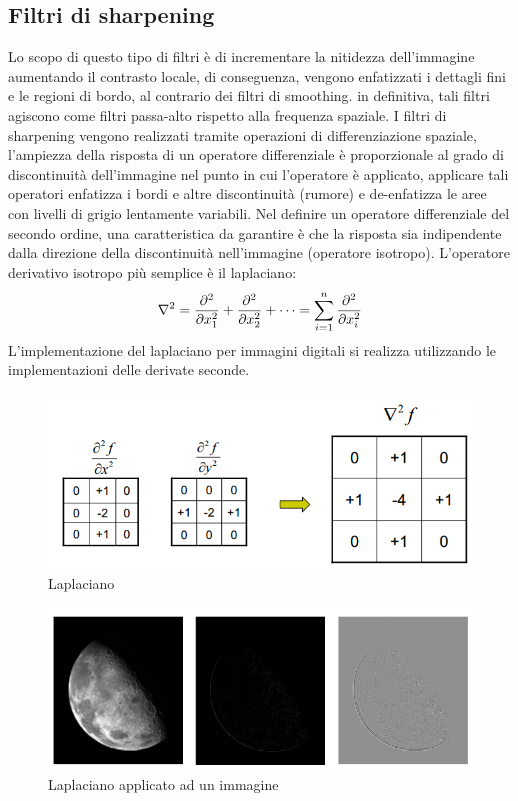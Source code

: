 \subsection{Filtri di sharpening}
Lo scopo di questo tipo di filtri è di incrementare la nitidezza dell’immagine 
aumentando il contrasto locale, di conseguenza, vengono enfatizzati i 
dettagli fini e le regioni di bordo, al contrario 
dei filtri di smoothing. in definitiva, tali filtri agiscono come filtri 
passa-alto rispetto alla frequenza spaziale.
I filtri di sharpening vengono realizzati tramite operazioni di 
differenziazione spaziale, l’ampiezza della risposta di un operatore 
differenziale è proporzionale al grado di discontinuità dell’immagine nel punto in cui 
l’operatore è applicato, applicare tali operatori enfatizza i 
bordi e altre discontinuità (rumore) e de-enfatizza le aree con livelli di grigio
lentamente variabili.
Nel definire un operatore differenziale del secondo  ordine, una
caratteristica da garantire è che la  risposta sia indipendente dalla
direzione della  discontinuità nell’immagine (operatore isotropo).
L’operatore derivativo isotropo più semplice è il  laplaciano:
\[
\nabla^2 = {\partial^2 \over \partial x^2_1 } + {\partial^2 \over \partial x^2_2 } + \dots = \sum_{i=1}^n \frac {\partial^2}{\partial x^2_i}
\]
L’implementazione del laplaciano per  immagini digitali si realizza
utilizzando le  implementazioni delle derivate seconde.
\begin{figure}[h]
\centering
\includegraphics[width=.5\textwidth]{img/laplaciano.png}
\caption{Laplaciano}
\label{fig:laplaciano}
\end{figure}
\begin{figure}[h]
\centering
\includegraphics[width=.8\textwidth]{img/laplaciano-applicato.png}
\caption{Laplaciano applicato ad un immagine}
\label{fig:laplaciano-applicato}
\end{figure}

